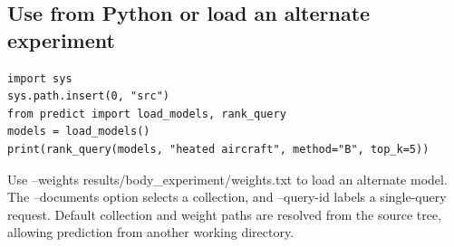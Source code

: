 \documentclass[12pt,a4paper]{article}
\begin{document}
\subsection{Use from Python or load an alternate experiment}
\begin{small}\begin{verbatim}
import sys
sys.path.insert(0, "src")
from predict import load_models, rank_query
models = load_models()
print(rank_query(models, "heated aircraft", method="B", top_k=5))
\end{verbatim}\end{small}
Use --weights results/body\_experiment/weights.txt to load an alternate model. The --documents option selects a collection, and --query-id labels a single-query request. Default collection and weight paths are resolved from the source tree, allowing prediction from another working directory.
\end{document}
